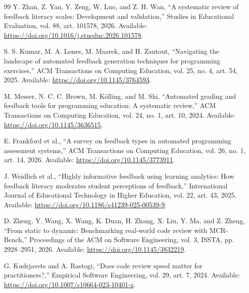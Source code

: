 \documentclass[10pt,conference,letterpaper]{IEEEtran}
\begin{document}
\begin{thebibliography}{99}
 Y. Zhan, Z. Yan, Y. Zeng, W. Luo, and Z. H. Wan, “A systematic review of feedback literacy scales: Development and validation,” Studies in Educational Evaluation, vol. 88, art. 101578, 2026. Available: \url{https://doi.org/10.1016/j.stueduc.2026.101578}.

 S. S. Kumar, M. A. Lones, M. Maarek, and H. Zantout, “Navigating the landscape of automated feedback generation techniques for programming exercises,” ACM Transactions on Computing Education, vol. 25, no. 4, art. 54, 2025. Available: \url{https://doi.org/10.1145/3764593}.

 M. Messer, N. C. C. Brown, M. Kölling, and M. Shi, “Automated grading and feedback tools for programming education: A systematic review,” ACM Transactions on Computing Education, vol. 24, no. 1, art. 10, 2024. Available: \url{https://doi.org/10.1145/3636515}.

 E. Frankford et al., “A survey on feedback types in automated programming assessment systems,” ACM Transactions on Computing Education, vol. 26, no. 1, art. 14, 2026. Available: \url{https://doi.org/10.1145/3773911}.

 J. Weidlich et al., “Highly informative feedback using learning analytics: How feedback literacy moderates student perceptions of feedback,” International Journal of Educational Technology in Higher Education, vol. 22, art. 43, 2025. Available: \url{https://doi.org/10.1186/s41239-025-00539-9}.

 D. Zheng, Y. Wang, X. Wang, K. Duan, H. Zhang, X. Liu, Y. Ma, and Z. Zheng, “From static to dynamic: Benchmarking real-world code review with MCR-Bench,” Proceedings of the ACM on Software Engineering, vol. 3, ISSTA, pp. 2928–2951, 2026. Available: \url{https://doi.org/10.1145/3832219}.

 G. Kudrjavets and A. Rastogi, “Does code review speed matter for practitioners?,” Empirical Software Engineering, vol. 29, art. 7, 2024. Available: \url{https://doi.org/10.1007/s10664-023-10401-z}.

\end{thebibliography}
\end{document}

